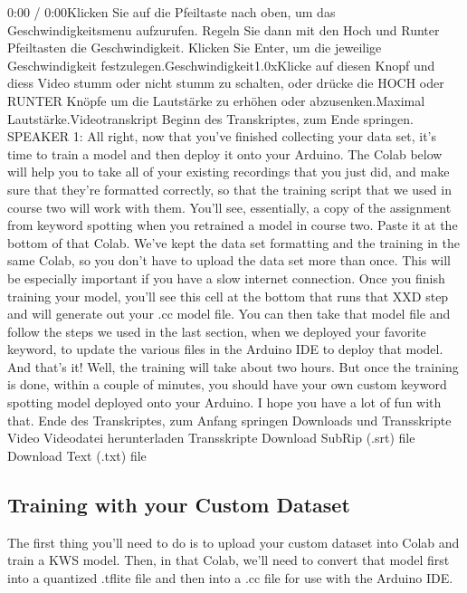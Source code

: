     0:00 / 0:00Klicken Sie auf die Pfeiltaste nach oben, um das Geschwindigkeitsmenu aufzurufen. Regeln Sie dann mit den Hoch und Runter Pfeiltasten die Geschwindigkeit. Klicken Sie Enter, um die jeweilige Geschwindigkeit festzulegen.Geschwindigkeit1.0xKlicke auf diesen Knopf und diess Video stumm oder nicht stumm zu schalten, oder drücke die HOCH oder RUNTER Knöpfe um die Lautstärke zu erhöhen oder abzusenken.Maximal Lautstärke.Videotranskript
    Beginn des Transkriptes, zum Ende springen.
    SPEAKER 1: All right, now that you've finished collecting your data set,
    it's time to train a model and then deploy it onto your Arduino.
    The Colab below will help you to take all of your existing recordings
    that you just did, and make sure that they're formatted correctly,
    so that the training script that we used in course two will work with them.
    You'll see, essentially, a copy of the assignment
    from keyword spotting when you retrained a model in course two.
    Paste it at the bottom of that Colab.
    We've kept the data set formatting and the training in the same Colab,
    so you don't have to upload the data set more than once.
    This will be especially important if you have a slow internet connection.
    Once you finish training your model, you'll see this cell at the bottom that
    runs that XXD step and will generate out your .cc model file.
    You can then take that model file and follow
    the steps we used in the last section, when we deployed
    your favorite keyword, to update the various files in the Arduino IDE
    to deploy that model.
    And that's it!
    Well, the training will take about two hours.
    But once the training is done, within a couple of minutes,
    you should have your own custom keyword spotting
    model deployed onto your Arduino.
    I hope you have a lot of fun with that.
    Ende des Transkriptes, zum Anfang springen
    Downloads und Transskripte
    Video
    Videodatei herunterladen
    Transskripte
    Download SubRip (.srt) file
    Download Text (.txt) file

\subsection{Training with your Custom Dataset}

 The first thing you’ll need to do is to upload your custom dataset into Colab and train a KWS model. Then, in that Colab, we’ll need to convert that model first into a quantized .tflite file and then into a .cc file for use with the Arduino IDE.
    

